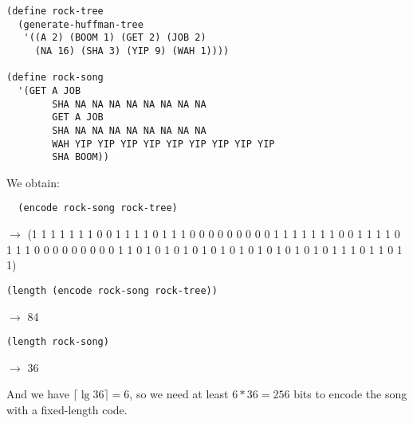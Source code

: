 \documentclass[a4paper,12pt]{article}
\begin{document}
\begin{lstlisting}
(define rock-tree
  (generate-huffman-tree
   '((A 2) (BOOM 1) (GET 2) (JOB 2)
     (NA 16) (SHA 3) (YIP 9) (WAH 1))))

(define rock-song
  '(GET A JOB
        SHA NA NA NA NA NA NA NA NA
        GET A JOB
        SHA NA NA NA NA NA NA NA NA
        WAH YIP YIP YIP YIP YIP YIP YIP YIP YIP
        SHA BOOM))
\end{lstlisting}
We obtain:
\begin{lstlisting}
  (encode rock-song rock-tree)
\end{lstlisting}
$\rightarrow$  (1 1 1 1 1 1 1 0 0 1 1 1 1 0 1 1 1 0 0 0 0 0 0 0 0 0 1 1 1 1 1 1 1 0 0 1 1 1 1 0 1 1 1 0 0 0 0 0 0 0 0 0 1 1 0 1 0 1 0 1 0 1 0 1 0 1 0 1 0 1 0 1 0 1 0 1 1 1 0 1 1 0 1 1)
\begin{lstlisting}
(length (encode rock-song rock-tree))
\end{lstlisting}
$\rightarrow$  84
\begin{lstlisting}
(length rock-song)
\end{lstlisting}
$\rightarrow$  36

And we have $\lceil \lg 36\rceil = 6$, so we need at least $6 * 36 =
256$ bits to encode the song with a fixed-length code.
\end{document}
